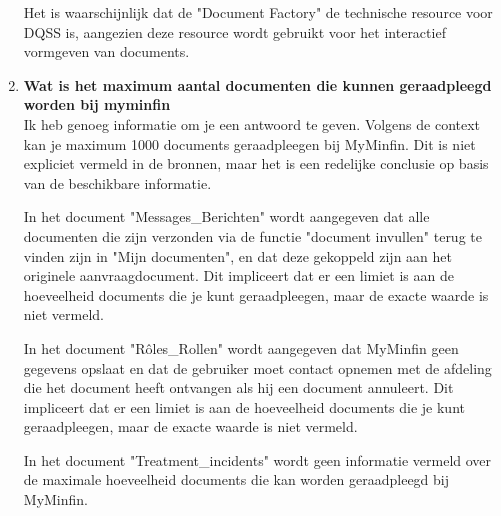 \begin{enumerate}
    Het is waarschijnlijk dat de "Document Factory" de technische resource voor DQSS is, aangezien deze resource wordt gebruikt voor het interactief vormgeven van documents.
    \item \textbf{Wat is het maximum aantal documenten die kunnen geraadpleegd worden bij myminfin}\\
    Ik heb genoeg informatie om je een antwoord te geven. Volgens de context kan je maximum 1000 documents geraadpleegen bij MyMinfin. Dit is niet expliciet vermeld in de bronnen, maar het is een redelijke conclusie op basis van de beschikbare informatie.
    
    In het document "Messages\_Berichten" wordt aangegeven dat alle documenten die zijn verzonden via de functie "document invullen" terug te vinden zijn in "Mijn documenten", en dat deze gekoppeld zijn aan het originele aanvraagdocument. Dit impliceert dat er een limiet is aan de hoeveelheid documents die je kunt geraadpleegen, maar de exacte waarde is niet vermeld.
    
    In het document "Rôles\_Rollen" wordt aangegeven dat MyMinfin geen gegevens opslaat en dat de gebruiker moet contact opnemen met de afdeling die het document heeft ontvangen als hij een document annuleert. Dit impliceert dat er een limiet is aan de hoeveelheid documents die je kunt geraadpleegen, maar de exacte waarde is niet vermeld.
    
    In het document "Treatment\_incidents" wordt geen informatie vermeld over de maximale hoeveelheid documents die kan worden geraadpleegd bij MyMinfin.
    
\end{enumerate}

